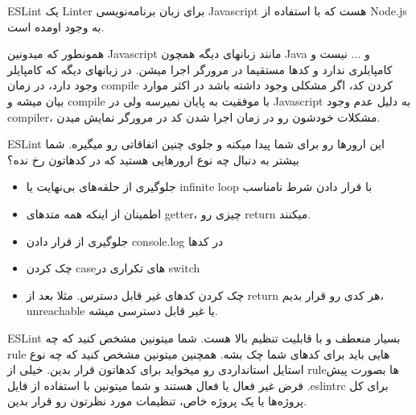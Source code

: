 ESLint یک Linter برای زبان برنامه‌نویسی Javascript هست که با استفاده از Node.js به وجود اومده است.

همونطور که میدونین Javascript مانند زبانهای دیگه همچون Java و ... نیست و کامپایلری ندارد و کدها مستقیما در مرورگر اجرا میشن. در زبانهای دیگه که کامپایلر وجود دارد، در زمان compile کردن کد، اگر مشکلی وجود داشته باشد در اکثر موارد بیان میشه و compile با موفقیت به پایان نمیرسه ولی در Javascript به دلیل عدم وجود compiler، مشکلات خودشون رو در زمان اجرا شدن کد در مرورگر نمایش میدن.

ESLint این ارورها رو برای شما پیدا میکنه و جلوی چنین اتفاقاتی رو میگیره. شما بیشتر به دنبال چه نوع ارورهایی هستید که در کدهاتون رخ نده؟
\begin{itemize}
	\item 
	جلوگیری از حلقه‌های بی‌نهایت یا infinite loop با قرار دادن شرط نامناسب
	\item 
	اطمینان از اینکه همه متدهای getter، چیزی رو return میکنند.
	\item 
	جلوگیری از قرار دادن console.log در کدها
	\item 
	چک کردن case‌های تکراری در switch
	\item 
	چک کردن کدهای غیر قابل دسترس. مثلا بعد از return هر کدی رو قرار بدیم، unreachable یا غیر قابل دسترسی میشه.
\end{itemize}

ESLint بسیار منعطف و با قابلیت تنظیم بالا هست. شما میتونین مشخص کنید که چه rule هایی باید برای کدهای شما چک بشه. همچنین میتونین مشخص کنید که چه نوع استایل استانداردی رو میخواید برای کدهاتون قرار بدین. خیلی از rule‌ها بصورت پیش فرض غیر فعال یا فعال هستند و شما میتونین با استفاده از فایل .eslintrc برای کل پروژه‌ها یا یک پروژه خاص، تنظیمات مورد نظرتون رو قرار بدین.